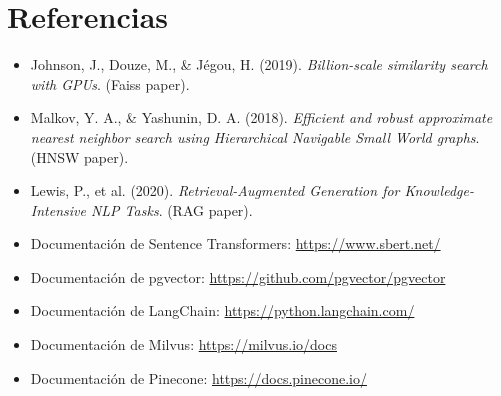 \documentclass[12pt,a4paper,openany,oneside]{book}
\begin{document}
\chapter*{Referencias}
\begin{itemize}
    \item Johnson, J., Douze, M., \& Jégou, H. (2019). \textit{Billion-scale similarity search with GPUs}. (Faiss paper).
    \item Malkov, Y. A., \& Yashunin, D. A. (2018). \textit{Efficient and robust approximate nearest neighbor search using Hierarchical Navigable Small World graphs}. (HNSW paper).
    \item Lewis, P., et al. (2020). \textit{Retrieval-Augmented Generation for Knowledge-Intensive NLP Tasks}. (RAG paper).
    \item Documentación de Sentence Transformers: \url{https://www.sbert.net/}
    \item Documentación de pgvector: \url{https://github.com/pgvector/pgvector}
    \item Documentación de LangChain: \url{https://python.langchain.com/}
    \item Documentación de Milvus: \url{https://milvus.io/docs}
    \item Documentación de Pinecone: \url{https://docs.pinecone.io/}
\end{itemize}
\end{document}
